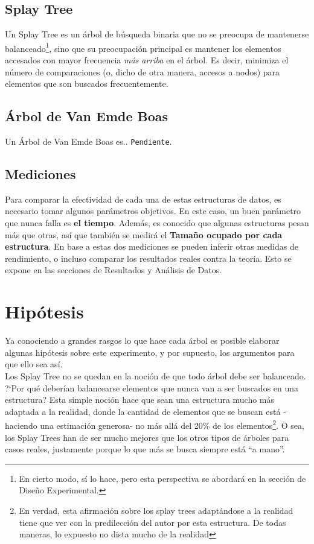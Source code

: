 \documentclass[12pt,letterpaper]{report}
\begin{document}
\subsection{Splay Tree}
\label{subsec:expl_splay}

Un Splay Tree es un árbol de búsqueda binaria que no se preocupa de mantenerse balanceado\footnote{En cierto modo, sí lo hace, pero esta perspectiva se abordará en la sección de Diseño Experimental.}, sino que su preocupación principal es mantener los elementos accesados con mayor frecuencia \emph{más arriba} en el árbol. Es decir, minimiza el número de comparaciones (o, dicho de otra manera, accesos a nodos) para elementos que son buscados frecuentemente.

\subsection{Árbol de Van Emde Boas}
\label{subsec:expl_veb}

Un Árbol de Van Emde Boas es.. \texttt{Pendiente}.

\subsection{Mediciones}
\label{subsec:mediciones}

Para comparar la efectividad de cada una de estas estructuras de datos, es necesario tomar algunos parámetros objetivos. En este caso, un buen parámetro que nunca falla es \textbf{el tiempo}. Además, es conocido que algunas estructuras pesan más que otras, así que también se medirá el \textbf{Tamaño ocupado por cada estructura}. En base a estas dos mediciones se pueden inferir otras medidas de rendimiento, o incluso comparar los resultados reales contra la teoría. Esto se expone en las secciones de Resultados y Análisis de Datos.

\newpage
\section{Hipótesis}
Ya conociendo a grandes rasgos lo que hace cada árbol es posible elaborar algunas hipótesis sobre este experimento, y por supuesto, los argumentos para que ello sea así.\\

Los Splay Tree no se quedan en la noción de que todo árbol debe ser balanceado. ?`Por qué deberían balancearse elementos que nunca van a ser buscados en una estructura? Esta simple noción hace que sean una estructura mucho más adaptada a la realidad, donde la cantidad de elementos que se buscan está -haciendo una estimación generosa- no más allá del 20\% de los elementos\footnote{En verdad, esta afirmación sobre los splay trees adaptándose a la realidad tiene que ver con la predilección del autor por esta estructura. De todas maneras, lo expuesto no dista mucho de la realidad}. O sea, los Splay Trees han de ser mucho mejores que los otros tipos de árboles para casos reales, justamente porque lo que más se busca siempre está ``a mano''.\\
\end{document}

